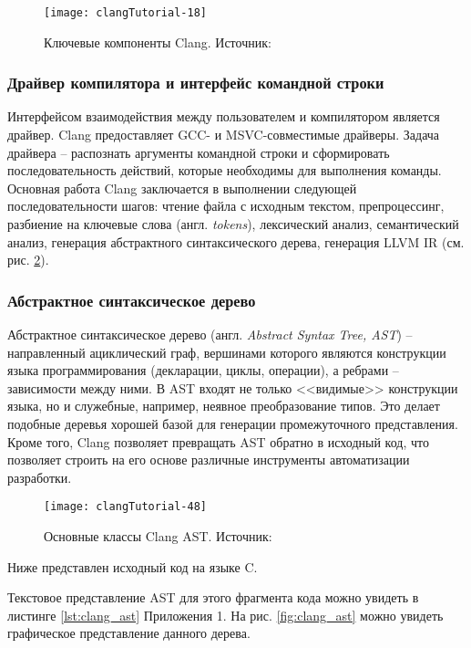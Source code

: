 \begin{figure}[h]
  \centering
  \texttt{[image: clangTutorial-18]}
  \caption{Ключевые компоненты Clang. Источник: \cite{VanHaagstretSvenARMandStulova2019}}
  \label{fig:clang_core}
\end{figure}
\subsubsection{Драйвер компилятора и интерфейс командной строки}
Интерфейсом взаимодействия между пользователем и компилятором является драйвер.
Clang предоставляет GCC- и MSVC-совместимые драйверы. Задача драйвера --
распознать аргументы командной строки и сформировать последовательность действий,
которые необходимы для выполнения команды. Основная работа Clang заключается
в выполнении следующей последовательности шагов: чтение файла с исходным текстом,
препроцессинг, разбиение на ключевые слова (англ. \textit{tokens}), лексический
анализ, семантический анализ, генерация абстрактного синтаксического дерева,
генерация LLVM IR (см. рис. \ref{fig:clang_core}).

\subsubsection{Абстрактное синтаксическое дерево}
Абстрактное синтаксическое дерево (англ. \textit{Abstract Syntax Tree, AST}) --
направленный ациклический граф, вершинами которого являются конструкции языка 
программирования (декларации, циклы, операции), а ребрами -- зависимости между
ними. В AST входят не только <<видимые>> конструкции языка, но и служебные,
например, неявное преобразование типов. Это делает подобные деревья хорошей
базой для генерации промежуточного представления. Кроме того, Clang позволяет
превращать AST обратно в исходный код, что позволяет строить на его основе
различные инструменты автоматизации разработки.
\begin{figure}[h]
  \centering
  \texttt{[image: clangTutorial-48]}
  \caption{Основные классы Clang AST. Источник: \cite{VanHaagstretSvenARMandStulova2019}}
  \label{fig:clang_core}
\end{figure}

Ниже представлен исходный код на языке C.

Текстовое представление AST для этого фрагмента кода можно увидеть в листинге
\ref{lst:clang_ast} Приложения 1. На рис. \ref{fig:clang_ast} можно увидеть
графическое представление данного дерева.

